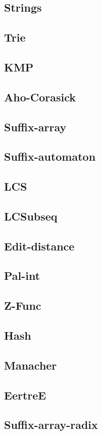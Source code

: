\documentclass{article}
\newcommand\includes[2]{ %
   \subsection{#1}
   
}
\begin{document}
\begin{multicols}{2}
\section{Strings}
\includes{Trie}{C++/Strings/Trie.cpp}
\includes{KMP}{C++/Strings/KMP.cpp}
\includes{Aho-Corasick}{C++/Strings/Aho-Corasick.cpp}
\includes{Suffix-array}{C++/Strings/Suffix-array.cpp}
\includes{Suffix-automaton}{C++/Strings/Suffix-automaton.cpp}
\includes{LCS}{C++/Strings/LCS.cpp}
\includes{LCSubseq}{C++/Strings/LCSubseq.cpp}
\includes{Edit-distance}{C++/Strings/Edit-distance.cpp}
\includes{Pal-int}{C++/Strings/Pal-int.cpp}
\includes{Z-Func}{C++/Strings/Z-Func.cpp}
\includes{Hash}{C++/Strings/Hash.cpp}
\includes{Manacher}{C++/Strings/Manacher.cpp}
\includes{EertreE}{C++/Strings/EertreE.cpp}
\includes{Suffix-array-radix}{C++/Strings/Suffix-array-radix.cpp}

\end{multicols}
\end{document}
